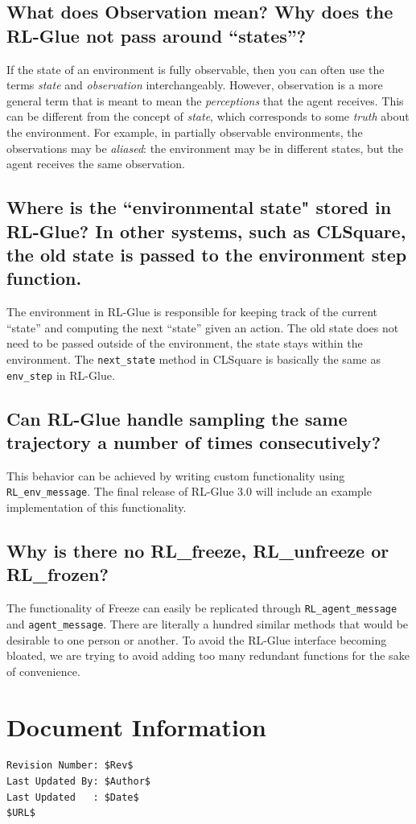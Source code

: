 \documentclass[11pt]{article}
\begin{document}
\subsection{What does Observation mean? Why does the RL-Glue not pass around ``states''?}
If the state of an environment is fully observable, then you can often use the terms \textit{state} and \textit{observation} interchangeably. However, 
observation is a more  general term that is meant to mean the \textit{perceptions} that the agent receives.  This can be different 
from the concept of \textit{state}, which corresponds to some \textit{truth} about the environment.  For example, in partially observable environments, the observations
may be \textit{aliased}: the environment may be in different states, but the agent receives the same observation. 


\subsection{Where is the ``environmental state" stored in RL-Glue? In other systems, such as CLSquare, the old state is passed to the environment step function.}
The environment in RL-Glue is responsible for keeping  track of the current ``state'' and computing the next ``state'' given an action. The old state does not need to be passed
outside of the environment, the state stays within the  environment. The \texttt{next\_state} method in CLSquare is basically the same as \texttt{env\_step} in RL-Glue.


\subsection{Can RL-Glue handle sampling the same trajectory a number of times consecutively?}
This behavior can be achieved by writing custom functionality using \texttt{RL\_env\_message}.  The final release of RL-Glue 3.0 will include an example implementation of this functionality.

\subsection{Why is there no RL\_freeze, RL\_unfreeze or RL\_frozen?}
The functionality of Freeze can easily be replicated through \texttt{RL\_agent\_message} and \texttt{agent\_message}.  There are literally a hundred similar methods that would 
be desirable to one person or another. To avoid the RL-Glue interface becoming bloated, we are trying to avoid adding too many redundant functions for the sake of convenience.


\section*{Document Information}
\begin{verbatim}
Revision Number: $Rev$
Last Updated By: $Author$
Last Updated   : $Date$
$URL$
\end{verbatim}
\end{document}
